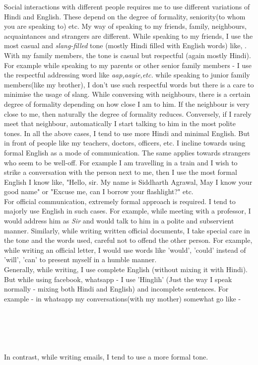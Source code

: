 \documentclass[12pt,a4paper]{article}
\begin{document}
Social interactions with different people requires me to use different variations of Hindi and English. These depend on the degree of formality, seniority(to whom you are speaking to) etc. My way of speaking to my friends, family, neighbours, acquaintances and strangers are different. While speaking to my friends, I use the most casual and \textit{slang-filled} tone (mostly Hindi filled with English words) like, . With my family members, the tone is casual but respectful (again mostly Hindi). For example while speaking to my parents or other senior family members - I use the respectful addressing word like \textit{aap,aayie,etc.} while speaking to junior family members(like my brother), I don't use such respectful words but there is a care to minimise the usage of slang. While conversing with neighbours, there is a certain degree of formality depending on how close I am to him. If the neighbour is very close to me, then naturally the degree of formality reduces. Conversely, if I rarely meet that neighbour, automatically I start talking to him in the most polite tones. In all the above cases, I tend to use more Hindi and minimal English. But in front of people like my teachers, doctors, officers, etc. I incline towards using formal English as a mode of communication. The same applies towards strangers who seem to be well-off. For example I am travelling in a train and I wish to strike a conversation with the person next to me, then I use the most formal English I know like, "Hello, sir. My name is Siddharth Agrawal, May I know your good name" or "Excuse me, can I borrow your flashlight?" etc.
\\

For official communication, extremely formal approach is required. I tend to majorly use English in such cases. For example, while meeting with a professor, I would address him as \textit{Sir} and would talk to him in a polite and subservient manner. Similarly, while writing written official documents, I take special care in the tone and the words used, careful not to offend the other person. For example, while writing an official letter, I would use words like 'would', 'could' instead of 'will', 'can' to present myself in a humble manner.
\\

Generally, while writing, I use complete English (without mixing it with Hindi). But while using facebook, whatsapp - I use 'Hinglih' (Just the way I speak normally - mixing both Hindi and English) and incomplete sentences. For example - in whatsapp my conversations(with my mother) somewhat go like -\\
\renewcommand{\thefootnote}{$\star$} 
\\
\\
\\
\\
\\
In contrast, while writing emails, I tend to use a more formal tone.
\\
\end{document}
